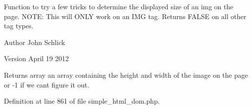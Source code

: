 Function to try a few tricks to determine the displayed size of an img on the page. N\+O\+TE\+: This will O\+N\+LY work on an I\+MG tag. Returns F\+A\+L\+SE on all other tag types.

\begin{DoxyAuthor}{Author}
John Schlick 
\end{DoxyAuthor}
\begin{DoxyVersion}{Version}
April 19 2012 
\end{DoxyVersion}
\begin{DoxyReturn}{Returns}
array an array containing the \textquotesingle{}height\textquotesingle{} and \textquotesingle{}width\textquotesingle{} of the image on the page or -\/1 if we can\textquotesingle{}t figure it out. 
\end{DoxyReturn}


Definition at line 861 of file simple\+\_\+html\+\_\+dom.\+php.


